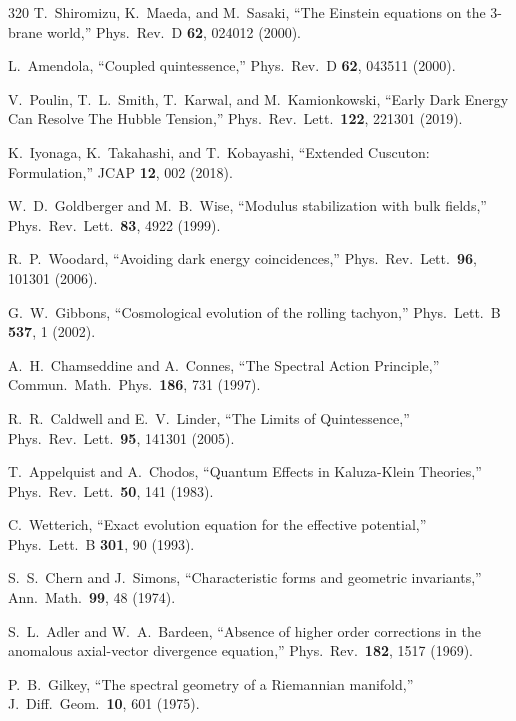 \begin{thebibliography}{320}
T.~Shiromizu, K.~Maeda, and M.~Sasaki,
``The Einstein equations on the 3-brane world,''
Phys.\ Rev.\ D \textbf{62}, 024012 (2000).

L.~Amendola,
``Coupled quintessence,''
Phys.\ Rev.\ D \textbf{62}, 043511 (2000).

V.~Poulin, T.~L.~Smith, T.~Karwal, and M.~Kamionkowski,
``Early Dark Energy Can Resolve The Hubble Tension,''
Phys.\ Rev.\ Lett.\ \textbf{122}, 221301 (2019).

K.~Iyonaga, K.~Takahashi, and T.~Kobayashi,
``Extended Cuscuton: Formulation,''
JCAP \textbf{12}, 002 (2018).

W.~D.~Goldberger and M.~B.~Wise,
``Modulus stabilization with bulk fields,''
Phys.\ Rev.\ Lett.\ \textbf{83}, 4922 (1999).

R.~P.~Woodard,
``Avoiding dark energy coincidences,''
Phys.\ Rev.\ Lett.\ \textbf{96}, 101301 (2006).

G.~W.~Gibbons,
``Cosmological evolution of the rolling tachyon,''
Phys.\ Lett.\ B \textbf{537}, 1 (2002).

A.~H.~Chamseddine and A.~Connes,
``The Spectral Action Principle,''
Commun.\ Math.\ Phys.\ \textbf{186}, 731 (1997).

R.~R.~Caldwell and E.~V.~Linder,
``The Limits of Quintessence,''
Phys.\ Rev.\ Lett.\ \textbf{95}, 141301 (2005).

T.~Appelquist and A.~Chodos,
``Quantum Effects in Kaluza-Klein Theories,''
Phys.\ Rev.\ Lett.\ \textbf{50}, 141 (1983).

C.~Wetterich,
``Exact evolution equation for the effective potential,''
Phys.\ Lett.\ B \textbf{301}, 90 (1993).

S.~S.~Chern and J.~Simons,
``Characteristic forms and geometric invariants,''
Ann.\ Math.\ \textbf{99}, 48 (1974).

S.~L.~Adler and W.~A.~Bardeen,
``Absence of higher order corrections in the anomalous axial-vector divergence equation,''
Phys.\ Rev.\ \textbf{182}, 1517 (1969).

P.~B.~Gilkey,
``The spectral geometry of a Riemannian manifold,''
J.\ Diff.\ Geom.\ \textbf{10}, 601 (1975).


\end{thebibliography}
